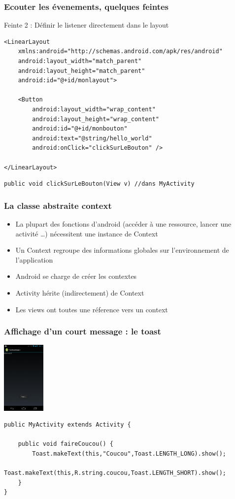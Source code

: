 \documentclass{beamer}
\begin{document}
\begin{frame}[fragile]
\frametitle{Ecouter les évenements, quelques feintes}
Feinte 2 : Définir le listener directement dans le layout
\begin{lstlisting}
<LinearLayout 
	xmlns:android="http://schemas.android.com/apk/res/android"
    android:layout_width="match_parent"
    android:layout_height="match_parent"
    android:id="@+id/monlayout">

    <Button
        android:layout_width="wrap_content"
        android:layout_height="wrap_content"
        android:id="@+id/monbouton"
        android:text="@string/hello_world"
        android:onClick="clickSurLeBouton" />

</LinearLayout>
\end{lstlisting}
\begin{lstlisting}
public void clickSurLeBouton(View v) //dans MyActivity
\end{lstlisting}
\end{frame}

\begin{frame}[fragile]
\frametitle{La classe abstraite context}
\begin{itemize}
 \item La plupart des fonctions d'android (accéder à une ressource,
 lancer une activité \ldots) nécessitent une instance de Context
 \item Un Context regroupe des informations globales sur l'environnement de
 l'application
 \item Android se charge de créer les contextes
 \item Activity hérite (indirectement) de Context
 \item Les views ont toutes une réference vers un context
 \end{itemize}
\end{frame}

\begin{frame}[fragile]
\frametitle{Affichage d'un court message : le toast}
\includegraphics[width=60pt]{coucou.png}
\begin{lstlisting}
public MyActivity extends Activity {
    
    public void faireCoucou() {
        Toast.makeText(this,"Coucou",Toast.LENGTH_LONG).show();
        Toast.makeText(this,R.string.coucou,Toast.LENGTH_SHORT).show();
    }	
}
\end{lstlisting}
\end{frame}
\end{document}
